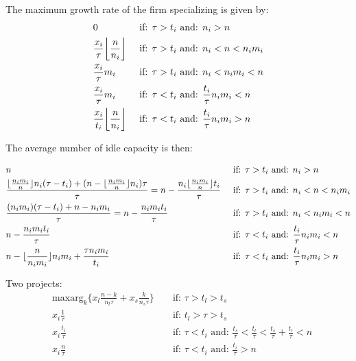 \documentclass[12pt]{report}
\numberwithin{equation}{section}
\DeclarePairedDelimiter\floor{\lfloor}{\rfloor}
\begin{document}
The maximum growth rate of the firm specializing is given by:
\begin{align*}
& 0 && \text{ if: } \tau > t_i \text{  and: } n_i>n \\
& \frac{x_i}{\tau} \floor*{\frac{n}{n_i}} && \text{ if: } \tau > t_i \text{  and: } n_i<n<n_i m_i \\
&\frac{x_i}{\tau} m_i && \text{ if: } \tau > t_i \text{  and: } n_i<n_im_i<n \\
&\frac{x_i }{\tau} m_i && \text{ if: } \tau < t_i \text{  and: } \frac{t_i}{\tau} n_i m_i<n \\
&\frac{x_i }{t_i} \floor*{\frac{n}{n_i}} && \text{ if: } \tau < t_i \text{  and: } \frac{t_i}{\tau} n_i m_i>n
\end{align*}

The average number of idle capacity is then:  

\begin{align*}
& n && \text{ if: } \tau > t_i \text{  and: } n_i>n \\
& \frac{ \floor{ \frac{n_i m_i}{n}} n_i(\tau - t_i)+(n-\floor{ \frac{n_i m_i}{n}}n_i) \tau }{\tau} = n - \frac{n_i \floor{ \frac{n_i m_i}{n}} t_i}{\tau} && \text{ if: } \tau > t_i \text{  and: } n_i<n<n_i m_i \\
& \frac{(n_i m_i)(\tau - t_i)+n-n_i m_i}{\tau}= n - \frac{n_i m_i t_i}{\tau} && \text{ if: } \tau > t_i \text{  and: } n_i<n_im_i<n \\
& n-\frac{n_i m_i t_i}{\tau} && \text{ if: } \tau < t_i \text{  and: } \frac{t_i}{\tau} n_i m_i<n \\
&n-\floor{\frac{n}{n_im_i}}n_im_i + \frac{\tau n_i m_i}{t_i}  && \text{ if: } \tau < t_i \text{  and: } \frac{t_i}{\tau} n_i m_i>n
\end{align*}

Two projects:
\begin{align*}
& \text{maxarg}_k \{ x_l\frac{n-k}{n_l \tau}+x_s\frac{k}{n_s \tau} \}  && \text{ if: } \tau > t_l>t_s \\
&x_i \frac{1}{\tau} && \text{ if: } t_l> \tau > t_s \\
&x_i \frac{t_i}{\tau} && \text{ if: } \tau < t_i \text{  and: } \frac{t_s}{\tau}<\frac{t_l}{\tau}<\frac{t_s}{\tau}+\frac{t_l}{\tau}<n \\
&x_i \frac{n}{\tau} && \text{ if: } \tau < t_i \text{  and: } \frac{t_i}{\tau}>n
\end{align*}



\end{document}
